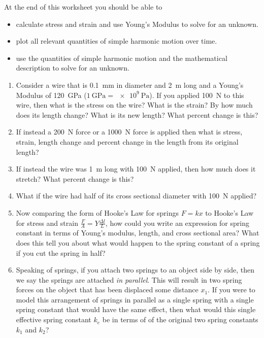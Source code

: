 At the end of this worksheet you should be able to  
\begin{itemize}
	\item calculate stress and strain and use Young's Modulus to solve for an unknown.
	\item plot all relevant quantities of simple harmonic motion over time.
	\item use the quantities of simple harmonic motion and the mathematical description to solve for an unknown.
\end{itemize}


\begin{enumerate}
\setlength\itemsep{2 in}

\item
Consider a wire that is \SI{0.1}{mm} in diameter and \SI{2}{m} long and a Young's Modulus of \SI{120}{\giga \pascal} ($\SI{1}{\giga\pascal}=\SI{e9}{\pascal}$). If you applied \SI{100}{N} to this wire, then what is the stress on the wire? What is the strain? By how much does its length change? What is its new length? What percent change is this?

\item
If instead a \SI{200}{N} force or a \SI{1000}{N} force is applied then what is stress, strain, length change and percent change in the length from its original length?\\

\item
If instead the wire was \SI{1}{m} long with \SI{100}{N} applied, then how much does it stretch? What percent change is this?

\item
What if the wire had half of its cross sectional diameter with \SI{100}{N} applied?

\item 
Now comparing the form of Hooke's Law for springs $F=kx$ to Hooke's Law for stress and strain $\tfrac{F}{A}= Y\tfrac{\Delta l}{L}$, how could you write an expression for spring constant in terms of Young's modulus, length, and cross sectional area? What does this tell you about what would happen to the spring constant of a spring if you cut the spring in half?

\item
Speaking of springs, if you attach two springs to an object side by side, then we say the springs are attached \emph{in parallel}. This will result in two spring forces on the object that has been displaced some distance $x_1$. If you were to model this arrangement of springs in parallel as a single spring with a single spring constant that would have the same effect, then what would this single effective spring constant $k_e$ be in terms of of the original two spring constants $k_1$ and $k_2$?


\end{enumerate}
